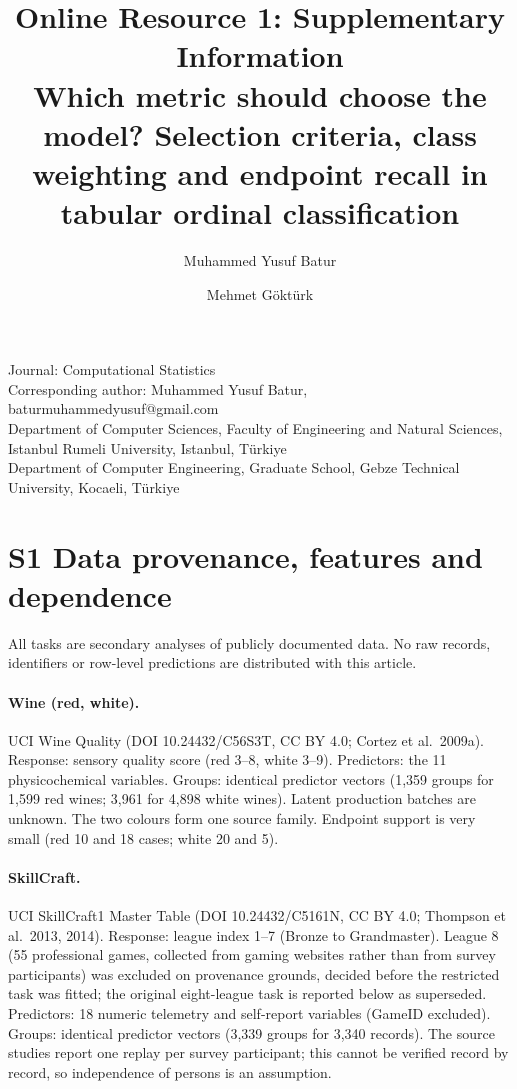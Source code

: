 \documentclass[10pt]{article}
\title{Online Resource 1: Supplementary Information\\[4pt]\large Which metric should choose the model? Selection criteria, class weighting and endpoint recall in tabular ordinal classification}
\author{Muhammed Yusuf Batur \and Mehmet G\"{o}kt\"{u}rk}
\date{}
\begin{document}
\maketitle

\begin{center}\small
Journal: Computational Statistics\\
Corresponding author: Muhammed Yusuf Batur, baturmuhammedyusuf@gmail.com\\
Department of Computer Sciences, Faculty of Engineering and Natural Sciences, Istanbul Rumeli University, Istanbul, T\"{u}rkiye\\
Department of Computer Engineering, Graduate School, Gebze Technical University, Kocaeli, T\"{u}rkiye
\end{center}

\section*{S1 Data provenance, features and dependence}

All tasks are secondary analyses of publicly documented data. No raw records, identifiers or row-level predictions are distributed with this article.

\paragraph{Wine (red, white).} UCI Wine Quality (DOI 10.24432/C56S3T, CC BY 4.0; Cortez et al.\ 2009a). Response: sensory quality score (red 3--8, white 3--9). Predictors: the 11 physicochemical variables. Groups: identical predictor vectors (1,359 groups for 1,599 red wines; 3,961 for 4,898 white wines). Latent production batches are unknown. The two colours form one source family. Endpoint support is very small (red 10 and 18 cases; white 20 and 5).

\paragraph{SkillCraft.} UCI SkillCraft1 Master Table (DOI 10.24432/C5161N, CC BY 4.0; Thompson et al.\ 2013, 2014). Response: league index 1--7 (Bronze to Grandmaster). League 8 (55 professional games, collected from gaming websites rather than from survey participants) was excluded on provenance grounds, decided before the restricted task was fitted; the original eight-league task is reported below as superseded. Predictors: 18 numeric telemetry and self-report variables (GameID excluded). Groups: identical predictor vectors (3,339 groups for 3,340 records). The source studies report one replay per survey participant; this cannot be verified record by record, so independence of persons is an assumption.
\end{document}
